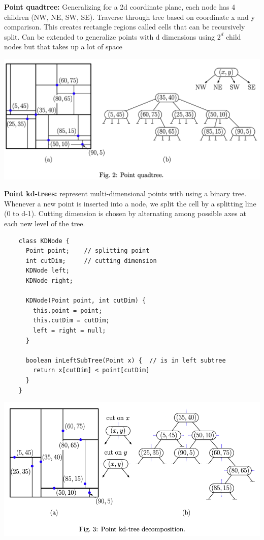 \documentclass{article}
\begin{document}
  \newpage
  \noindent \textbf{Point quadtree: }Generalizing for a 2d coordinate plane, each node has 4 children (NW, NE, SW, SE). Traverse through tree based on coordinate x and y comparison. This creates rectangle regions called cells that can be recursively split. Can be extended to generalize points with d dimensions using $2^{d}$ child nodes but that takes up a lot of space
  \begin{center}
  \includegraphics[scale=0.2]{PointQuadtree}
  \end{center}
  \textbf{Point kd-trees: }represent multi-dimensional points with using a binary tree. Whenever a new point is inserted into a node, we split the cell by a splitting line (0 to d-1). Cutting dimension is chosen by alternating among possible axes at each new level of the tree. 
  \begin{lstlisting}
    class KDNode {
      Point point;    // splitting point
      int cutDim;     // cutting dimension
      KDNode left;
      KDNode right;

      KDNode(Point point, int cutDim) {
        this.point = point;
        this.cutDim = cutDim;
        left = right = null;
      }

      boolean inLeftSubTree(Point x) {  // is in left subtree
        return x[cutDim] < point[cutDim]
      }
    }
  \end{lstlisting}
  \begin{center}
  \includegraphics[scale=0.4]{PointKDTree}
  \end{center}
\end{document}
